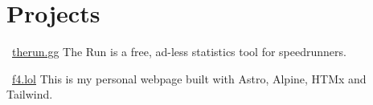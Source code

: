 \section{Projects}

\resumeSubHeadingListStart

	\resumeSubheading
		{\faGlobe \ \href{https://therun.gg}{\underline{therun.gg}}}{}
		{\qquad The Run is a free, ad-less statistics tool for speedrunners.}{}
		\resumeItemListStart
		\resumeItemListEnd

	\resumeSubheading
		{\faGlobe \ \href{https://f4.lol}{\underline{f4.lol}}}{}
		{\qquad This is my personal webpage built with Astro, Alpine, HTMx and Tailwind.}{}
		\resumeItemListStart
		\resumeItemListEnd

\resumeSubHeadingListEnd